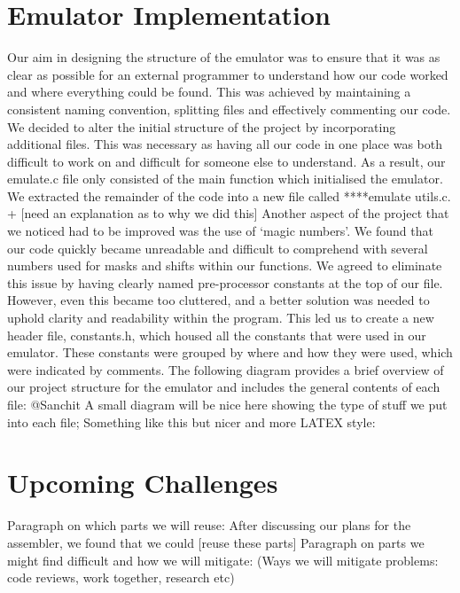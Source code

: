 \documentclass[11pt]{article}
\begin{document}
\section*{Emulator Implementation}
Our aim in designing the structure of the emulator was to ensure that it was as clear as possible for an external
programmer to understand how our code worked and where everything could be found. This was achieved by
maintaining a consistent naming convention, splitting files and effectively commenting our code.
We decided to alter the initial structure of the project by incorporating additional files. This was necessary as
having all our code in one place was both difficult to work on and difficult for someone else to understand. As
a result, our emulate.c file only consisted of the main function which initialised the emulator. We extracted the
remainder of the code into a new file called ****emulate utils.c. + [need an explanation as to why we did this]
Another aspect of the project that we noticed had to be improved was the use of ‘magic numbers’. We found
that our code quickly became unreadable and difficult to comprehend with several numbers used for masks
and shifts within our functions. We agreed to eliminate this issue by having clearly named pre-processor
constants at the top of our file. However, even this became too cluttered, and a better solution was needed to
uphold clarity and readability within the program. This led us to create a new header file, constants.h, which
housed all the constants that were used in our emulator. These constants were grouped by where and how
they were used, which were indicated by comments.
The following diagram provides a brief overview of our project structure for the emulator and includes the
general contents of each file:
@Sanchit A small diagram will be nice here showing the type of stuff we put into each file; Something like this
but nicer and more LATEX style:


\section*{Upcoming Challenges}
Paragraph on which parts we will reuse:
After discussing our plans for the assembler, we found that we could [reuse these parts]
Paragraph on parts we might find difficult and how we will mitigate:
(Ways we will mitigate problems: code reviews, work together, research etc)
\end{document}
